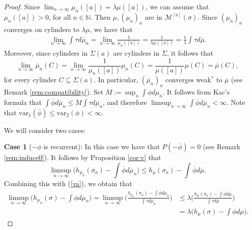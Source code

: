\documentclass[letterpaper,11pt]{amsart}
\theoremstyle{plain}
\theoremstyle{plain}
\theoremstyle{definition}
\theoremstyle{remark}
\def\N{{\mathbb N}}
\def\M{{\mathcal M}}
\begin{document}
\begin{proof}
 Since $\lim_{n\to\infty}\mu_n([a])=\lambda\mu([a])$, we can assume that $\mu_n([a])>0$, for all $n\in\N$. Then $\mu, (\mu_n)_n$ are in $\M^{[a]}(\sigma)$. Since $(\mu_n)_n$ converges on cylinders to $\lambda\mu$, we have that \begin{align}\label{va} \lim_{n\to\infty}\int \tau d\overline{\mu}_n=\lim_{n\to\infty}\frac{1}{\mu_n([a])}=\frac{1}{\lambda\mu([a])}=\frac{1}{\lambda}\int \tau d\overline{\mu}.\end{align}
Moreover, since cylinders in $\Sigma(a)$ are cylinders in $\Sigma$, it follows that $$\lim_{n\to\infty}\overline{\mu}_n(C)=\lim_{n\to\infty}\frac{1}{\mu_n([a])}\mu_n(C)=\frac{1}{\mu([a])}\mu(C)=\overline{\mu}(C),$$
for every cylinder $C\subseteq \Sigma(a)$. In particular, $(\overline{\mu}_n)_n$ converges weak$^*$ to $\overline{\mu}$ (see Remark \ref{rem:compatibility}). Set $M:=\sup_n \int \phi d\mu_n$. It follows from Kac's formula that $\int \overline{\phi}d\overline{\mu}_n \le M  \int \tau d\overline{\mu}_n$, and therefore $\limsup_{n\to\infty} \int \overline{\phi}d\overline{\mu}_n<\infty$.  Note that $\text{var}_1(\overline{\phi})\le \text{var}_2(\phi)<\infty$. 

We will consider two cases:

{\bf Case 1} ($-\phi$ is recurrent): In this case we have that $P(-\overline{\phi})=0$ (see Remark \ref{rem:induce0}). It follows by Proposition \ref{cor:v} that 
$$\limsup_{n\to\infty}\big( h_{\overline{\mu}_n}(\sigma_a)-\int \overline{\phi} d\overline{\mu}_n\big)\le h_{\overline{\mu}}(\sigma_a)-\int \overline{\phi} d\overline{\mu}.$$
Combining this with (\ref{va}), we obtain that 
\begin{align*} \limsup_{n\to\infty}\big( h_{\mu_n}(\sigma)-\int \phi d\mu_n\big)=\limsup_{n\to\infty}\bigg(\frac{h_{\overline{\mu}_n}(\sigma_a)-\int \overline{\phi} d\overline{\mu}_n}{\int \tau d\overline{\mu}_n}\bigg)&\le \lambda\bigg(\frac{h_{\overline{\mu}}(\sigma_a)-\int \overline{\phi} d\overline{\mu}}{\int \tau d\overline{\mu}}\bigg)\\ 
 &=\lambda\big(h_\mu(\sigma)-\int \phi d\mu\big).\end{align*}


\end{proof}
\end{document}
